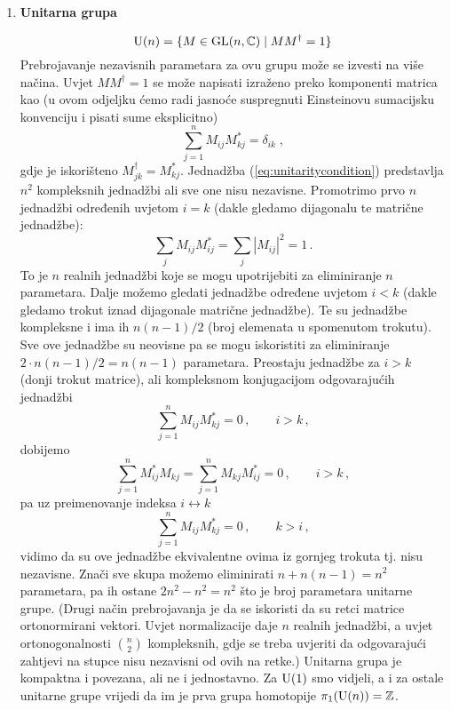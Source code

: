 \begin{enumerate}[leftmargin=0pt, itemindent=0pt]
\item \textbf{Unitarna grupa}

\begin{equation}
\mathrm{U}(n) = \{ M\in \mathrm{GL}(n,\mathbb{C}) \; | \; M M^{\dagger} = 1\}
\end{equation}
Prebrojavanje nezavisnih parametara za ovu grupu može se izvesti
na više načina. Uvjet $M M^\dagger = 1$ se može napisati izraženo
preko komponenti matrica kao (u ovom odjeljku ćemo radi jasnoće
suspregnuti Einsteinovu sumacijsku konvenciju i pisati sume eksplicitno)
\begin{equation}
\sum_{j=1}^{n} M_{ij} M_{kj}^* = \delta_{ik}\;,
\label{eq:unitaritycondition}
\end{equation}
gdje je iskorišteno $M^{\dagger}_{jk} = M^{*}_{kj}$.
Jednadžba (\ref{eq:unitaritycondition}) predstavlja $n^2$ kompleksnih
jednadžbi ali sve one nisu nezavisne. Promotrimo prvo $n$ jednadžbi
određenih uvjetom $i=k$ (dakle gledamo dijagonalu te matrične jednadžbe):
\begin{equation}
 \sum_j M_{ij} M^{*}_{ij} = \sum_j |M_{ij}|^2 = 1 \,.
\label{eq:diagonalcondition}
\end{equation}
To je $n$ realnih jednadžbi koje se mogu upotrijebiti za eliminiranje
$n$ parametara. Dalje možemo gledati jednadžbe određene uvjetom
$i < k$ (dakle gledamo trokut iznad dijagonale matrične jednadžbe).
Te su jednadžbe kompleksne i ima ih $n(n-1)/2$ (broj elemenata u 
spomenutom trokutu). Sve ove jednadžbe su neovisne pa se mogu
iskoristiti za eliminiranje $2 \cdot n(n-1)/2 = n(n-1)$ parametara.
Preostaju jednadžbe za $i >k$ (donji trokut matrice), ali kompleksnom
konjugacijom odgovarajućih jednadžbi
\begin{equation}
\sum_{j=1}^{n} M_{ij} M_{kj}^* = 0\,, \qquad i>k \,,
\end{equation}
dobijemo
\begin{equation}
\sum_{j=1}^{n} M_{ij}^* M_{kj}  = \sum_{j=1}^{n} M_{kj} M_{ij}^* = 0\,, \qquad i>k \,,
\end{equation}
pa uz preimenovanje indeksa $i \leftrightarrow k$
\begin{equation}
\sum_{j=1}^{n}  M_{ij} M_{kj}^* = 0\,, \qquad k>i \,,
\end{equation}
vidimo da su ove jednadžbe ekvivalentne ovima iz gornjeg trokuta tj. nisu
nezavisne.
Znači sve skupa možemo eliminirati $n + n(n-1) = n^2$ parametara, pa ih
ostane $2n^2 - n^2 = n^2$ što je broj parametara unitarne grupe.
(Drugi način prebrojavanja je da se iskoristi da su retci matrice ortonormirani
vektori. Uvjet normalizacije daje $n$ realnih jednadžbi, a uvjet
ortonogonalnosti $\binom{n}{2}$ kompleksnih, gdje se treba uvjeriti
da odgovarajući zahtjevi na stupce nisu nezavisni od ovih na retke.)
Unitarna grupa je kompaktna i povezana, ali ne i jednostavno. Za $\mathrm{U}(1)$
smo vidjeli, a i za ostale unitarne grupe
vrijedi da im je prva grupa homotopije $\pi_{1}(\mathrm{U}(n)) = \mathbb{Z}$.


\end{enumerate}
